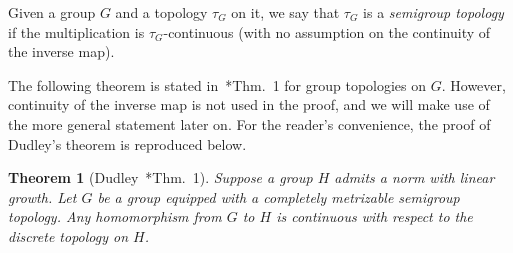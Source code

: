 \documentclass[12pt]{paper}
\numberwithin{equation}{section}
\theoremstyle{plain}
\newtheorem{theorem}{Theorem}[section]
\theoremstyle{definition}
\begin{document}
Given a group \(G\) and a topology \(\tau_{G}\) on it, we say that \(\tau_{G}\) is a \emph{semigroup
  topology} if the multiplication is \(\tau_{G}\)-continuous (with no assumption on the continuity
of the inverse map).

The following theorem is stated in~\cite{dudleyContinuityHomomorphisms1961}*{Thm.~1} for group
topologies on \(G\).  However, continuity of the inverse map is not used in the proof, and we will
make use of the more general statement later on.  For the reader's convenience, the proof of
Dudley's theorem is reproduced below.

\begin{theorem}[Dudley~{\cite{dudleyContinuityHomomorphisms1961}*{Thm.~1}}]
  \label{thm:dudley-theorem}
  Suppose a group \(H\) admits a norm with linear growth.  Let \(G\) be a group equipped with a
  completely metrizable semigroup topology.  Any homomorphism from \(G\) to \(H\) is continuous with
  respect to the discrete topology on \(H\).
\end{theorem}
\end{document}
